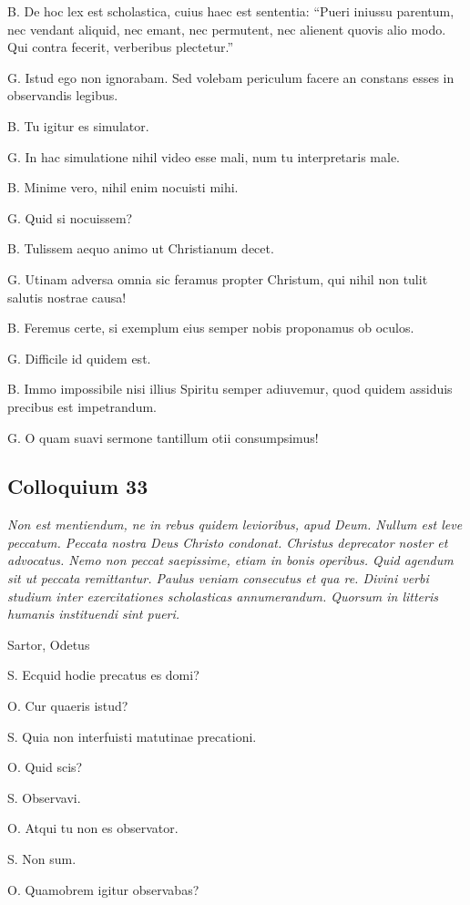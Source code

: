 \documentclass{article}
\begin{document}
B. De hoc lex est scholastica, cuius haec est sententia: ``Pueri iniussu parentum, nec vendant aliquid, nec emant, nec permutent, nec alienent quovis alio modo. Qui contra fecerit, verberibus plectetur.''

G. Istud ego non ignorabam. Sed volebam periculum facere an constans esses in observandis legibus.

B. Tu igitur es simulator.

G. In hac simulatione nihil video esse mali, num tu interpretaris male.

B. Minime vero, nihil enim nocuisti mihi.

G. Quid si nocuissem?

B. Tulissem aequo animo ut Christianum decet.

G. Utinam adversa omnia sic feramus propter Christum, qui nihil non tulit salutis nostrae causa!

B. Feremus certe, si exemplum eius semper nobis proponamus ob oculos.

G. Difficile id quidem est.

B. Immo impossibile nisi illius Spiritu semper adiuvemur, quod quidem assiduis precibus est impetrandum.

G. O quam suavi sermone tantillum otii consumpsimus!

\subsection{Colloquium 33}
\emph{Non est mentiendum, ne in rebus quidem levioribus, apud Deum. Nullum est leve peccatum. Peccata nostra Deus Christo condonat. Christus deprecator noster et advocatus. Nemo non peccat saepissime, etiam in bonis operibus. Quid agendum sit ut peccata remittantur. Paulus veniam consecutus et qua re. Divini verbi studium inter exercitationes scholasticas annumerandum. Quorsum in litteris humanis instituendi sint pueri.}

Sartor, Odetus

S. Ecquid hodie precatus es domi?

O. Cur quaeris istud?

S. Quia non interfuisti matutinae precationi.

O. Quid scis?

S. Observavi.

O. Atqui tu non es observator.

S. Non sum.

O. Quamobrem igitur observabas?
\end{document}
